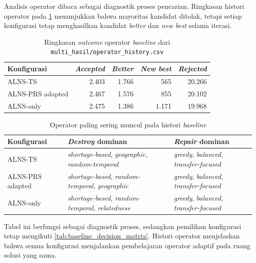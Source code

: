 \documentclass{file/TA-ITS}
\theoremstyle{definition}
\theoremstyle{definition}
\theoremstyle{plain}
\begin{document}
Analisis operator dibaca sebagai diagnostik proses pencarian. Ringkasan histori operator pada \ref{tab:operator_history_summary} menunjukkan bahwa mayoritas kandidat ditolak, tetapi setiap konfigurasi tetap menghasilkan kandidat \textit{better} dan \textit{new best} selama iterasi.

\begin{table}[H]
\centering
\caption{Ringkasan \textit{outcome} operator \textit{baseline} dari \texttt{multi\_hasil/operator\_history.csv}}
\label{tab:operator_history_summary}
\small
\begin{tabular}{@{}lrrrr@{}}
\toprule
\textbf{Konfigurasi} & \textbf{\textit{Accepted}} & \textbf{\textit{Better}} & \textbf{\textit{New best}} & \textbf{\textit{Rejected}} \\
\midrule
ALNS-TS & 2.403 & 1.766 & 565 & 20.266 \\
ALNS-PRS adapted & 2.467 & 1.576 & 855 & 20.102 \\
ALNS-only & 2.475 & 1.386 & 1.171 & 19.968 \\
\bottomrule
\end{tabular}
\end{table}

\begin{table}[H]
\centering
\caption{Operator paling sering muncul pada histori \textit{baseline}}
\label{tab:operator_top_summary}
\small
\begin{tabularx}{\textwidth}{@{}p{}p{}X@{}}
\toprule
\textbf{Konfigurasi} & \textbf{\textit{Destroy} dominan} & \textbf{\textit{Repair} dominan} \\
\midrule
ALNS-TS & \textit{shortage-based}, \textit{geographic}, \textit{random-temporal} & \textit{greedy}, \textit{balanced}, \textit{transfer-focused} \\
ALNS-PRS adapted & \textit{shortage-based}, \textit{random-temporal}, \textit{geographic} & \textit{greedy}, \textit{balanced}, \textit{transfer-focused} \\
ALNS-only & \textit{shortage-based}, \textit{random-temporal}, \textit{relatedness} & \textit{greedy}, \textit{balanced}, \textit{transfer-focused} \\
\bottomrule
\end{tabularx}
\end{table}
\noindent Tabel ini berfungsi sebagai diagnostik proses, sedangkan pemilihan konfigurasi tetap mengikuti \ref{tab:baseline_decision_matrix}. Histori operator menjelaskan bahwa semua konfigurasi menjalankan pembelajaran operator adaptif pada ruang solusi yang sama.
\end{document}
